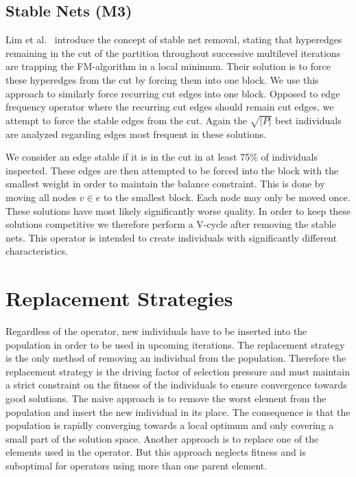\documentclass[a4paper,12pt,titlepage, BCOR7mm,headsepline]{scrbook}
\numberwithin{equation}{section}
\begin{document}
\subsection{Stable Nets (M3)}
Lim et al.~\cite{lim1997large} introduce the concept of stable net removal, stating that hyperedges remaining in the cut of the partition throughout successive multilevel iterations are trapping the FM-algorithm in a local minimum. Their solution is to force these hyperedges from the cut by forcing them into one block. 
We use this approach to similarly force recurring cut edges into one block. 
Opposed to edge frequency operator where the recurring cut edges should remain cut edges, we attempt to force the stable edges from the cut.
Again the $\sqrt{|P|}$ best individuals are analyzed regarding edges most frequent in these solutions. 

We consider an edge stable if it is in the cut in at least 75\% of individuals inspected.
These edges are then attempted to be forced into the block with the smallest weight in order to maintain the balance constraint. This is done by moving all nodes $ v \in e$ to the smallest block.
Each node may only be moved once.
These solutions have most likely significantly worse quality. %
In order to keep these solutions competitive we therefore perform a V-cycle after removing the stable nets. This operator is intended to create individuals with significantly different characteristics. 
\section{Replacement Strategies}
\label{sec:replacement}
Regardless of the operator, new individuals have to be inserted into the population in order to be used in upcoming iterations. The replacement strategy is the only method of removing an individual from the population.
Therefore the replacement strategy is the driving factor of selection pressure and must maintain a strict constraint on the fitness of the individuals to ensure convergence towards good solutions. 
The naive approach is to remove the worst element from the population and insert the new individual in its place.
The consequence is that the population is rapidly converging towards a local optimum and only covering a small part of the solution space. Another approach is to replace one of the elements used in the operator. %
But this approach neglects fitness and is suboptimal for operators using more than one parent element. 
\end{document}
